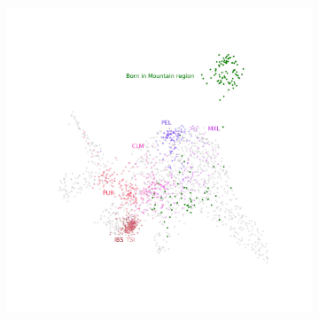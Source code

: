 \documentclass[12pt]{pnas-new}
\begin{document}
\begin{figure}
    \centering
    \begin{subfigure}{0.49\columnwidth}
    \includegraphics[width=\columnwidth]{images/HRS_1000G_NP1_UMAP_PC7_NC2_NN15_MD05_pca_hrshisp_added1kgp_2018115153245_1kgp_hisp.jpeg}
    \caption{}
    \label{fig:supp_umap_hrs_hisp_1kgp_hisp}
    \end{subfigure}\hfill
    \unskip\ \vrule\
        \begin{subfigure}{0.49\columnwidth}

\end{subfigure}
\end{figure}
\end{document}
